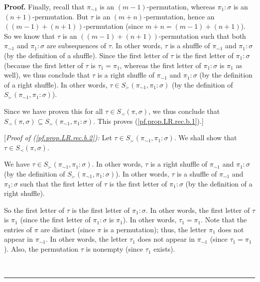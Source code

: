 \documentclass[numbers=enddot,12pt,final,onecolumn,notitlepage]{scrartcl}%
\theoremstyle{definition}
\newenvironment{proof}[1][Proof]{\noindent\textbf{#1.} }{\ \rule{0.5em}{0.5em}}
\newenvironment{verlong}{}{}
\begin{document}
\begin{verlong}
\begin{proof}
Finally, recall that $\pi_{\sim1}$ is an $\left(  m-1\right)  $-permutation,
whereas $\pi_{1}:\sigma$ is an $\left(  n+1\right)  $-permutation. But $\tau$
is an $\left(  m+n\right)  $-permutation, hence an $\left(  \left(
m-1\right)  +\left(  n+1\right)  \right)  $-permutation (since $m+n=\left(
m-1\right)  +\left(  n+1\right)  $). So we know that $\tau$ is an
\newline$\left(  \left(  m-1\right)  +\left(  n+1\right)  \right)
$-permutation such that both $\pi_{\sim1}$ and $\pi_{1}:\sigma$ are
subsequences of $\tau$. In other words, $\tau$ is a shuffle of $\pi_{\sim1}$
and $\pi_{1}:\sigma$ (by the definition of a shuffle). Since the first letter
of $\tau$ is the first letter of $\pi_{1}:\sigma$ (because the first letter of
$\tau$ is $\tau_{1}=\pi_{1}$, whereas the first letter of $\pi_{1}:\sigma$ is
$\pi_{1}$ as well), we thus conclude that $\tau$ is a right shuffle of
$\pi_{\sim1}$ and $\pi_{1}:\sigma$ (by the definition of a right shuffle). In
other words, $\tau\in S_{\succ}\left(  \pi_{\sim1},\pi_{1}:\sigma\right)  $
(by the definition of $S_{\succ}\left(  \pi_{\sim1},\pi_{1}:\sigma\right)  $).

Since we have proven this for all $\tau\in S_{\prec}\left(  \pi,\sigma\right)
$, we thus conclude that $S_{\prec}\left(  \pi,\sigma\right)  \subseteq
S_{\succ}\left(  \pi_{\sim1},\pi_{1}:\sigma\right)  $. This proves
(\ref{pf.prop.LR.rec.b.1}).]

[\textit{Proof of (\ref{pf.prop.LR.rec.b.2}):} Let $\tau\in S_{\succ}\left(
\pi_{\sim1},\pi_{1}:\sigma\right)  $. We shall show that $\tau\in S_{\prec
}\left(  \pi,\sigma\right)  $.

We have $\tau\in S_{\succ}\left(  \pi_{\sim1},\pi_{1}:\sigma\right)  $. In
other words, $\tau$ is a right shuffle of $\pi_{\sim1}$ and $\pi_{1}:\sigma$
(by the definition of $S_{\succ}\left(  \pi_{\sim1},\pi_{1}:\sigma\right)  $).
In other words, $\tau$ is a shuffle of $\pi_{\sim1}$ and $\pi_{1}:\sigma$ such
that the first letter of $\tau$ is the first letter of $\pi_{1}:\sigma$ (by
the definition of a right shuffle).

So the first letter of $\tau$ is the first letter of $\pi_{1}:\sigma$. In
other words, the first letter of $\tau$ is $\pi_{1}$ (since the first letter
of $\pi_{1}:\sigma$ is $\pi_{1}$). In other words, $\tau_{1}=\pi_{1}$. Note
that the entries of $\pi$ are distinct (since $\pi$ is a permutation); thus,
the letter $\pi_{1}$ does not appear in $\pi_{\sim1}$. In other words, the
letter $\tau_{1}$ does not appear in $\pi_{\sim1}$ (since $\tau_{1}=\pi_{1}$).
Also, the permutation $\tau$ is nonempty (since $\tau_{1}$ exists).


\end{proof}
\end{verlong}
\end{document}
